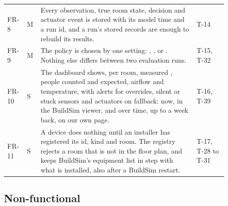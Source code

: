 \begin{longtable}[]{@{}L{0.07\linewidth}L{0.04\linewidth}L{0.66\linewidth}L{0.13\linewidth}@{}}
FR-8 & M & Every observation, true room state, decision and actuator event is
stored with its model time and a run id, and a run's stored records are enough
to rebuild its results. & T-14 \\
FR-9 & M & The policy is chosen by one setting: ,
,  or . Nothing else differs
between two evaluation runs. & T-15, T-32 \\
FR-10 & S & The dashboard shows, per room, measured \COtwo{}, people counted
and expected, airflow and temperature, with alerts for overrides, silent or
stuck sensors and actuators on fallback: now, in the BuildSim viewer, and over
time, up to a week back, on our own page. & T-16, T-39 \\
FR-11 & S & A device does nothing until an installer has registered its id,
kind and room. The registry rejects a room that is not in the floor plan, and
keeps BuildSim's equipment list in step with what is installed, also after a
BuildSim restart. & T-17, T-28 to T-31 \\
\bottomrule
\end{longtable}

\subsection{Non-functional}

